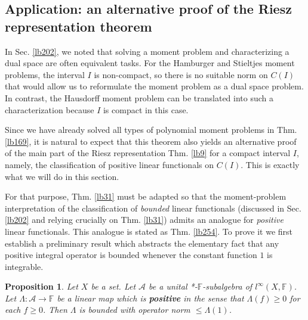 \documentclass[12pt,b5paper,notitlepage]{article}
\theoremstyle{definition}
\theoremstyle{plain}
\newtheorem{pp}[df]{Proposition}
\newcommand{\scr}{\mathscr}
\newcommand{\Fbb}{\mathbb F}
\numberwithin{equation}{section}
\begin{document}
\subsection{Application: an alternative proof of the Riesz representation theorem}\label{lb244}


In Sec. \ref{lb202}, we noted that solving a moment problem and characterizing a dual space are often equivalent tasks. For the Hamburger and Stieltjes moment problems, the interval $I$ is non-compact, so there is no suitable norm on $C(I)$ that would allow us to reformulate the moment problem as a dual space problem. In contrast, the Hausdorff moment problem can be translated into such a characterization because $I$ is compact in this case.

Since we have already solved all types of polynomial moment problems in Thm. \ref{lb169}, it is natural to expect that this theorem also yields an alternative proof of the main part of the Riesz representation Thm. \ref{lb9} for a compact interval
$I$, namely, the classification of positive linear functionals on 
$C(I)$. This is exactly what we will do in this section.

For that purpose, Thm. \ref{lb31} must be adapted so that the moment-problem interpretation of the classification of \textit{bounded} linear functionals (discussed in Sec. \ref{lb202} and relying crucially on Thm. \ref{lb31}) admits an analogue for \textit{positive} linear functionals. This analogue is stated as Thm. \ref{lb254}. To prove it we first establish a preliminary result which abstracts the elementary fact that any positive integral operator is bounded whenever the constant function $1$ is integrable.








\begin{pp}\label{lb204}
Let $X$ be a set. Let $\scr A$ be a unital *-$\Fbb$-subalgebra of $l^\infty(X,\Fbb)$.  Let $\Lambda:\scr A\rightarrow\Fbb$ be a linear map which is \textbf{positive} in the sense that $\Lambda(f)\geq0$ for each $f\geq0$. Then $\Lambda$ is bounded with operator norm $\leq \Lambda(1)$. 
\end{pp}
\end{document}
